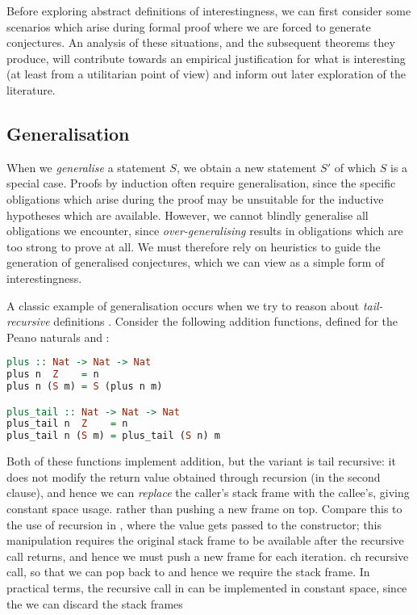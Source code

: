 \documentclass[]{article}
\begin{document}
Before exploring abstract definitions of interestingness, we can first consider some scenarios which arise during formal proof where we are forced to generate conjectures. An analysis of these situations, and the subsequent theorems they produce, will contribute towards an empirical justification for what is interesting (at least from a utilitarian point of view) and inform out later exploration of the literature.

\subsection{Generalisation}

When we \emph{generalise} a statement $S$, we obtain a new statement $S'$ of which $S$ is a special case. Proofs by induction often require generalisation, since the specific obligations which arise during the proof may be unsuitable for the inductive hypotheses which are available. However, we cannot blindly generalise all obligations we encounter, since \emph{over-generalising} results in obligations which are too strong to prove at all. We must therefore rely on heuristics to guide the generation of generalised conjectures, which we can view as a simple form of interestingness.

A classic example of generalisation occurs when we try to reason about \emph{tail-recursive} definitions \cite{kapur2003automatic}. Consider the following addition functions, defined for the Peano naturals  and :

\begin{lstlisting}[language=Haskell, xleftmargin=.2\textwidth, xrightmargin=.2\textwidth]
plus :: Nat -> Nat -> Nat
plus n  Z    = n
plus n (S m) = S (plus n m)

plus_tail :: Nat -> Nat -> Nat
plus_tail n  Z    = n
plus_tail n (S m) = plus_tail (S n) m
\end{lstlisting}

Both of these functions implement addition, but the  variant is tail recursive: it does not modify the return value obtained through recursion (in the second clause), and hence we can \emph{replace} the caller's stack frame with the callee's, giving constant space usage. rather than pushing a new frame on top. Compare this to the use of recursion in , where the value gets passed to the  constructor; this manipulation requires the original stack frame to be available after the recursive call returns, and hence we must push a new frame for each iteration. ch recursive call, so that we can pop back to and hence we require the stack frame. In practical terms, the recursive call in  can be implemented in constant space, since the we can discard the stack frames
\fi
\end{document}
